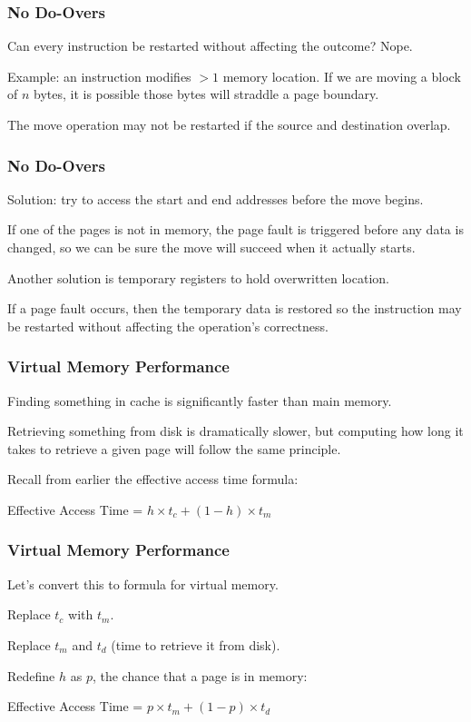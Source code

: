 \begin{frame}
\frametitle{No Do-Overs}

Can every instruction be restarted without affecting the outcome? Nope.

Example: an instruction modifies $> 1$ memory location. If we are moving a block of $n$ bytes, it is possible those bytes will straddle a page boundary.

The move operation may not be restarted if the source and destination overlap.

\end{frame}

\begin{frame}
\frametitle{No Do-Overs}

Solution: try to access the start and end addresses before the move begins. 

If one of the pages is not in memory, the page fault is triggered before any data is changed, so we can be sure the move will succeed when it actually starts. 

Another solution is temporary registers to hold overwritten location. 

If a page fault occurs, then the temporary data is restored so the instruction may be restarted without affecting the operation's correctness.

\end{frame}

\begin{frame}
\frametitle{Virtual Memory Performance}

Finding something in cache is significantly faster than main memory. 

Retrieving something from disk is dramatically slower, but computing how long it takes to retrieve a given page will follow the same principle. 

Recall from earlier the effective access time formula:

\begin{center}
	Effective Access Time = $ h \times t_{c} + (1 - h) \times t_{m}$
\end{center}


\end{frame}

\begin{frame}
\frametitle{Virtual Memory Performance}

Let's convert this to formula for virtual memory.

Replace $t_{c}$ with $t_{m}$.

Replace $t_{m}$ and $t_{d}$ (time to retrieve it from disk).

Redefine $h$ as $p$, the chance that a page is in memory:

\begin{center}
	Effective Access Time = $ p \times t_{m} + (1 - p) \times t_{d}$
\end{center}

\end{frame}



